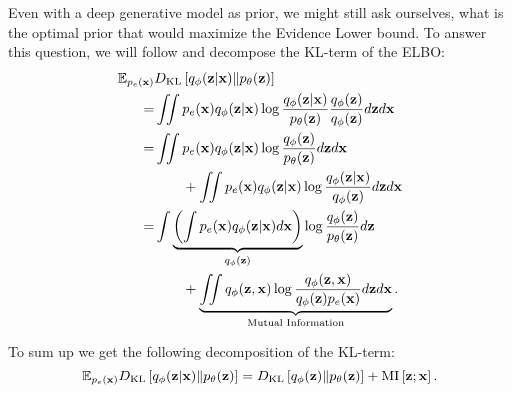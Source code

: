 Even with a deep generative model as prior, we might still ask ourselves, what is the optimal prior that would maximize the Evidence Lower bound. 
To answer this question, we will follow \citet{hoffman2016elbo} and decompose the KL-term of the ELBO:
\begin{align}
\mathbb{E}_{p_e({\mathbf{x}})} &D_{\mathrm{KL}}\left[q_{\phi}({\mathbf{z}}|{\mathbf{x}})\|p_{\theta}({\mathbf{z}})\right] \\
=& \iint p_e({\mathbf{x}}) q_{\phi}({\mathbf{z}}|{\mathbf{x}}) \log \frac{q_{\phi}({\mathbf{z}}|{\mathbf{x}})}{p_{\theta}({\mathbf{z}})}\frac{q_{\phi}({\mathbf{z}})}{q_{\phi}({\mathbf{z}})}d{\mathbf{z}} d{\mathbf{x}} \\
 =&\iint p_e({\mathbf{x}})  q_{\phi}({\mathbf{z}}|{\mathbf{x}}) \log \frac{q_{\phi}({\mathbf{z}})}{p_{\theta}({\mathbf{z}})}d{\mathbf{z}}  d{\mathbf{x}} \notag\\
&\quad\quad + \iint p_e({\mathbf{x}}) q_{\phi}({\mathbf{z}}|{\mathbf{x}}) \log \frac{q_{\phi}({\mathbf{z}}|{\mathbf{x}})}{q_{\phi}({\mathbf{z}})}d{\mathbf{z}}  d{\mathbf{x}} \\
 =&  \int\underbrace{\left( \int p_{e}({\mathbf{x}}) q_{\phi}({\mathbf{z}}|{\mathbf{x}})d{\mathbf{x}}\right)}_{q_{\phi}({\mathbf{z}})} \log \frac{q_{\phi}({\mathbf{z}})}{p_{\theta}({\mathbf{z}})}d{\mathbf{z}} \notag\\
&\quad\quad+ \underbrace{\iint q_{\phi}({\mathbf{z}}, {\mathbf{x}}) \log \frac{q_{\phi}({\mathbf{z}}, {\mathbf{x}})}{q_{\phi}({\mathbf{z}})p_{e}({\mathbf{x}})}d{\mathbf{z}}  d{\mathbf{x}}}_{\text{Mutual Information}}. 
\end{align}

To sum up we get the following decomposition of the KL-term:
\begin{equation}\label{eq:intro_kl_to_vamp}
    \E_{p_e(\rvx)} \KL{q_{\phi}(\rvz|\rvx)}{p_{\theta}(\rvz)} =  \KL{q_{\phi}(\rvz)}{p_{\theta}(\rvz)}
+ \text{MI}\left[\rvz; \rvx\right].
\end{equation}

